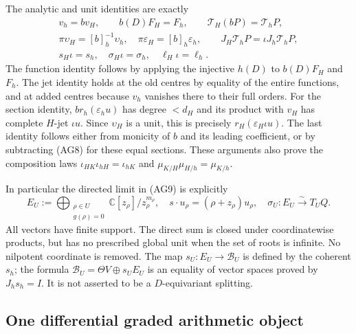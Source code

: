 The analytic and unit identities are exactly
\[
 \begin{gathered}
 v_h=bv_H,\qquad b(D)F_H=F_h,\qquad
 \mathcal T_H(bP)=\mathcal T_hP,\\
 \pi\upsilon_H=[b]_h^{-1}\upsilon_h,
 \quad\pi\varepsilon_H=[b]_h\varepsilon_h,\qquad
 J_H\mathcal T_hP=\iota J_h\mathcal T_hP,\\
 s_H\iota=s_h,\quad\sigma_H\iota=\sigma_h,
 \quad\ell_H\iota=\ell_h.
 \end{gathered}\tag{AG12}
\]
The function identity follows by applying the injective $h(D)$
to $b(D)F_H$ and $F_h$.  The jet identity holds at the old centres
by equality of the entire functions, and at added centres because
$v_h$ vanishes there to their full orders.  For the section identity,
$b r_h(\varepsilon_hu)$ has degree $<d_H$ and its product with
$v_H$ has complete $H$-jet $\iota u$.  Since $\upsilon_H$
is a unit, this is precisely $r_H(\varepsilon_H\iota u)$.
The last identity follows either from monicity of $b$ and its
leading coefficient, or by subtracting (AG8) for these equal
sections.  These arguments also prove the composition laws
$\iota_{HK}\iota_{hH}=\iota_{hK}$ and
$\mu_{K/H}\mu_{H/h}=\mu_{K/h}$.

In particular the directed limit in (AG9) is explicitly
\[
 E_U:=\bigoplus_{\substack{\rho\in U\\g(\rho)=0}}
       \mathbb C[z_\rho]/z_\rho^{m_\rho},
 \quad s\cdot u_\rho=(\rho+z_\rho)u_\rho,
 \quad \sigma_U:E_U\xrightarrow{\sim}T_UQ.
 \tag{AG13}
\]
All vectors have finite support.  The direct sum is closed under
coordinatewise products, but has no prescribed global unit when
the set of roots is infinite.  No nilpotent coordinate is removed.
The map $s_U:E_U\to\mathscr B_U$ is defined by the coherent
$s_h$; the formula $\mathscr B_U=\Theta V\oplus s_UE_U$
is an equality of vector spaces proved by $J_hs_h=I$.
It is not asserted to be a $D$-equivariant splitting.

\subsection{One differential graded arithmetic object}

